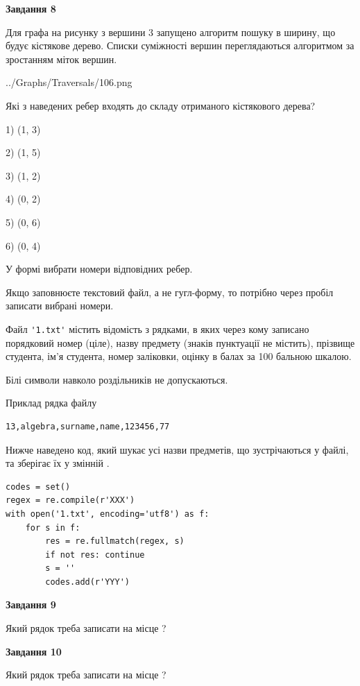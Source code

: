 \documentclass[12pt, ukrainian]{article}
\def\code#1{\Verb!#1!}
\begin{document}
{\begin {large}
{\begin {center}\textbf{Завдання 8}\end {center}}\par
Для графа на рисунку з вершини 3 запущено алгоритм пошуку в ширину, що будує кістякове дерево. Списки суміжності вершин переглядаються алгоритмом за зростанням міток вершин.\par
\begin{center}
	{../Graphs/Traversals/106.png}
\end{center}
\par Які з наведених ребер входять до складу отриманого кістякового дерева?\par
1) (1, 3)\par
2) (1, 5)\par
3) (1, 2)\par
4) (0, 2)\par
5) (0, 6)\par
6) (0, 4)\par
{\vskip 15pt} У формі вибрати номери відповідних ребер.


Якщо заповнюєте текстовий файл, а не гугл-форму, то потрібно через пробіл записа\-ти вибрані номери.\par
\newpage


Файл \code{'1.txt'} містить відомість з рядками, в яких через кому записано поряд\-ковий номер (ціле), назву предмету (знаків пунктуації не містить), прізвище студента, ім'я студента, номер заліковки, оцінку в балах за 100 бальною шкалою.

Білі символи навколо роздільників не допускаються.

Приклад рядка файлу



\begin{verbatim}
13,algebra,surname,name,123456,77
\end{verbatim}


Нижче наведено код, який шукає усі назви предметів, що зустрічаються у файлі, та зберігає їх у змінній .



\begin{verbatim}
codes = set()
regex = re.compile(r'XXX')
with open('1.txt', encoding='utf8') as f:
    for s in f:
        res = re.fullmatch(regex, s)
        if not res: continue
        s = ''
        codes.add(r'YYY')
\end{verbatim}


{\begin {center}\textbf{Завдання 9}\end {center}}\par
Який рядок треба записати на місце  ?\par
\vspace{5mm}


{\begin {center}\textbf{Завдання 10}\end {center}}\par
Який рядок треба записати на місце  ?\par


\newpage


\end {large}}
\end{document}
